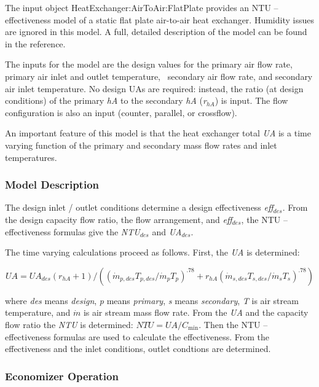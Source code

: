 The input object HeatExchanger:AirToAir:FlatPlate provides an NTU -- effectiveness model of a static flat plate air-to-air heat exchanger. Humidity issues are ignored in this model. A full, detailed description of the model can be found in the reference.

The inputs for the model are the design values for the primary air flow rate, primary air inlet and outlet temperature,~ secondary air flow rate, and secondary air inlet temperature. No design UAs are required: instead, the ratio (at design conditions) of the primary \emph{hA} to the secondary \emph{hA} (\emph{r\(_{hA}\)}) is input. The flow configuration is also an input (counter, parallel, or crossflow).

An important feature of this model is that the heat exchanger total \emph{UA} is a time varying function of the primary and secondary mass flow rates and inlet temperatures.

\subsubsection{Model Description}\label{model-description-1-007}

The design inlet / outlet conditions determine a design effectiveness \emph{eff}\(_{des}\). From the design capacity flow ratio, the flow arrangement, and \emph{eff}\(_{des}\), the NTU -- effectiveness formulas give the \emph{NTU\(_{des}\)} and \emph{UA\(_{des}\)}.

The time varying calculations proceed as follows. First, the \emph{UA} is determined:

\begin{equation}
UA = U{A_{des}}({r_{hA}} + 1)/({({\dot m_{p,des}}{T_{p,des}}/{\dot m_p}{T_p})^{.78}} + {r_{hA}}{({\dot m_{s,des}}{T_{s,des}}/{\dot m_s}{T_s})^{.78}})
\end{equation}

where \emph{des} means \emph{design}, \emph{p} means \emph{primary}, \emph{s} means \emph{secondary}, \emph{T} is air stream temperature, and \(\dot m\) is air stream mass flow rate. From the \emph{UA} and the capacity flow ratio the \emph{NTU} is determined: \(NTU = UA/{C_{\min }}\). Then the NTU -- effectiveness formulas are used to calculate the effectiveness. From the effectiveness and the inlet conditions, outlet condtions are determined.

\subsubsection{Economizer Operation}\label{economizer-operation-1}

